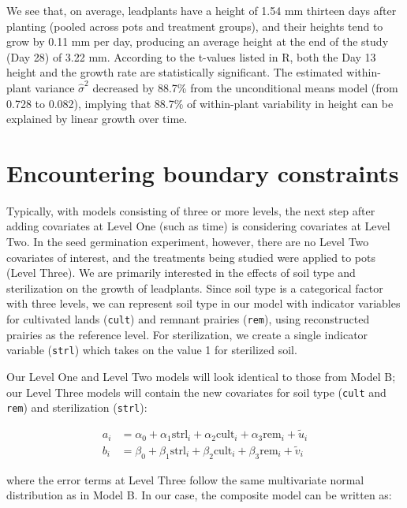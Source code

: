 \documentclass[
]{krantz}
\begin{document}
We see that, on average, leadplants have a height of 1.54 mm thirteen days after planting (pooled across pots and treatment groups), and their heights tend to grow by 0.11 mm per day, producing an average height at the end of the study (Day 28) of 3.22 mm. According to the t-values listed in R, both the Day 13 height and the growth rate are statistically significant. The estimated within-plant variance \(\hat{\sigma}^2\) decreased by 88.7\% from the unconditional means model (from 0.728 to 0.082), implying that 88.7\% of within-plant variability in height can be explained by linear growth over time.

\hypertarget{sec:boundary}{%
\section{Encountering boundary constraints}\label{sec:boundary}}

Typically, with models consisting of three or more levels, the next step after adding covariates at Level One (such as time) is considering covariates at Level Two. In the seed germination experiment, however, there are no Level Two covariates of interest, and the treatments being studied were applied to pots (Level Three). We are primarily interested in the effects of soil type and sterilization on the growth of leadplants. Since soil type is a categorical factor with three levels, we can represent soil type in our model with indicator variables for cultivated lands (\texttt{cult}) and remnant prairies (\texttt{rem}), using reconstructed prairies as the reference level. For sterilization, we create a single indicator variable (\texttt{strl}) which takes on the value 1 for sterilized soil.

Our Level One and Level Two models will look identical to those from Model B; our Level Three models will contain the new covariates for soil type (\texttt{cult} and \texttt{rem}) and sterilization (\texttt{strl}):

\begin{align*}
a_{i} & = \alpha_{0}+\alpha_{1}\textrm{strl}_{i}+\alpha_{2}\textrm{cult}_{i}+\alpha_{3}\textrm{rem}_{i}+\tilde{u}_{i} \\
b_{i} & = \beta_{0}+\beta_{1}\textrm{strl}_{i}+\beta_{2}\textrm{cult}_{i}+\beta_{3}\textrm{rem}_{i}+\tilde{v}_{i}
\end{align*}

where the error terms at Level Three follow the same multivariate normal distribution as in Model B. In our case, the composite model can be written as:
\end{document}
